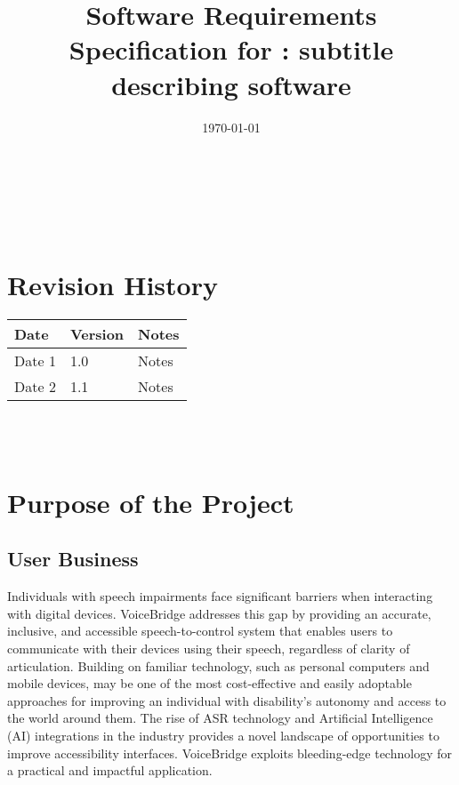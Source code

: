 \documentclass[12pt]{article}
\begin{document}
\title{Software Requirements Specification for \progname: subtitle describing software} 
\author{\authname}
\date{\today}
	
\maketitle

~\newpage


\tableofcontents

~\newpage

\section*{Revision History}

\begin{tabularx}{\textwidth}{p{3cm}p{2cm}X}
\toprule {\textbf{Date}} & {\textbf{Version}} & {\textbf{Notes}}\\
\midrule
Date 1 & 1.0 & Notes\\
Date 2 & 1.1 & Notes\\
\bottomrule
\end{tabularx}

~\\

~\newpage
\section{Purpose of the Project}
\subsection{User Business}


Individuals with speech impairments face significant barriers when interacting with digital devices. VoiceBridge addresses this gap by providing an accurate, inclusive, and accessible speech-to-control system that enables users to communicate with their devices using their speech, regardless of clarity of articulation. Building on familiar technology, such as personal computers and mobile devices, may be one of the most cost-effective and easily adoptable approaches for improving an individual with disability’s autonomy and access to the world around them. The rise of ASR technology and Artificial Intelligence (AI) integrations in the industry provides a novel landscape of opportunities to improve accessibility interfaces. VoiceBridge exploits bleeding-edge technology for a practical and impactful application.
\end{document}
